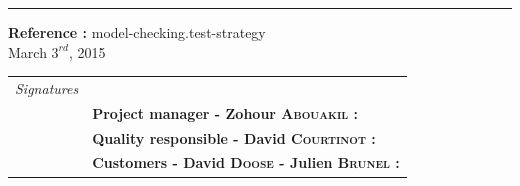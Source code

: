\documentclass{report}
\begin{document}
\begin{titlepage}


\vspace*{4.5cm}

\noindent
\begin{minipage}{0.35\linewidth}
    \begin{flushright}
        \printauthor
    \end{flushright}
\end{minipage} \hspace{15pt}
%
\begin{minipage}{0.02\linewidth}
    \rule{1pt}{175pt}
\end{minipage} \hspace{-10pt}
%
\begin{minipage}{0.6\linewidth}
\vspace{5pt}
\newenvironment{test}{\begin{center}}{\end{center}}
\hspace{10pt}
\begin{minipage}{\linewidth} 
\textbf{Reference :} model-checking.test-strategy ~\\
March $3^{rd}$, 2015
\end{minipage}
\end{minipage}

\vspace{8cm}
\begin{minipage}{0.20\linewidth}
    \begin{flushright}
       
        \begin{tabular}{ll}
	 \textit{Signatures} & \\
			& \textbf{Project manager - Zohour \textsc{Abouakil} :} \\
            & \textbf{Quality responsible - David \textsc{Courtinot} :} \\
            & \textbf{Customers - David \textsc{Doose} - Julien \textsc{Brunel} :} \\
        \end{tabular}
    \end{flushright}
\end{minipage}

\end{titlepage}
\restoregeometry
\tableofcontents
{}
\end{document}
